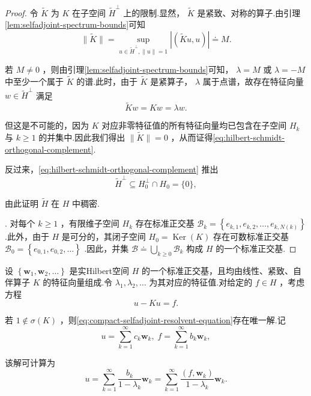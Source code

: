 \begin{proof}
令 $\widetilde{K}$ 为 $K$ 在子空间 ${\widetilde{H}}^{ \bot  }$ 上的限制.显然， $\widetilde{K}$ 是紧致、对称的算子.由引理\ref{lem:selfadjoint-spectrum-bounds}可知
\[
\| \widetilde{K}\|  = \mathop{\sup }\limits_{{u \in  {\widetilde{H}}^{ \bot  },\| u\|  = 1}}\left| \left( {\widetilde{K}u,u}\right) \right|  \doteq  M.
\]

若 $M \neq  0$ ，则由引理\ref{lem:selfadjoint-spectrum-bounds}可知， $\lambda  = M$ 或 $\lambda  =  - M$ 中至少一个属于 $\widetilde{K}$ 的谱.此时，由于 $\widetilde{K}$ 是紧算子， $\lambda$ 属于点谱，故存在特征向量 $w \in  {\widetilde{H}}^{ \bot  }$ 满足
\[
\widetilde{K}w = {Kw} = {\lambda w}.
\]

但这是不可能的，因为 $K$ 对应非零特征值的所有特征向量均已包含在子空间 ${H}_{k}$ 与 $k \geq  1$ 的并集中.因此我们得出 $\| \widetilde{K}\|  = 0$ ，从而证得\eqref{eq:hilbert-schmidt-orthogonal-complement}.

反过来，\eqref{eq:hilbert-schmidt-orthogonal-complement} 推出
\[
{\widetilde{H}}^{ \bot  } \subseteq  {H}_{0}^{ \bot  } \cap  {H}_{0} = \{ 0\} ,
\]

由此证明 $\widetilde{H}$ 在 $H$ 中稠密.

. 对每个 $k \geq  1$ ，有限维子空间 ${H}_{k}$ 存在标准正交基 ${\mathcal{B}}_{k} = \left\{  {{e}_{k,1},{e}_{k,2},\ldots ,{e}_{k,N\left( k\right) }}\right\}$ .此外，由于 $H$ 是可分的，其闭子空间 ${H}_{0} = \operatorname{Ker}\left( K\right)$ 存在可数标准正交基 ${\mathcal{B}}_{0} = \left\{  {{e}_{0,1},{e}_{0,2},\ldots }\right\}$ .因此，并集 $\mathcal{B} \doteq  \mathop{\bigcup }\limits_{{k \geq  0}}{\mathcal{B}}_{k}$ 构成 $H$ 的一个标准正交基.
\end{proof}

\begin{remark}\label{rem:compact-selfadjoint-solution-expansion}
设 $\left\{  {{\bm{w}}_{1},{\bm{w}}_{2},\ldots }\right\}$ 是实Hilbert空间 $H$ 的一个标准正交基，且均由线性、紧致、自伴算子 $K$ 的特征向量组成.令 ${\lambda }_{1},{\lambda }_{2},\ldots$ 为其对应的特征值.对给定的 $f \in  H$ ，考虑方程
\begin{equation}\tag{6.9}\label{eq:compact-selfadjoint-resolvent-equation}
u - {Ku} = f.
\end{equation}

若 $1 \notin  \sigma \left( K\right)$ ，则\eqref{eq:compact-selfadjoint-resolvent-equation}存在唯一解.记
\[
u = \mathop{\sum }\limits_{{k = 1}}^{\infty }{c}_{k}{\bm{w}}_{k},\;f = \mathop{\sum }\limits_{{k = 1}}^{\infty }{b}_{k}{\bm{w}}_{k},
\]

该解可计算为
\begin{equation}\tag{6.10}\label{eq:compact-selfadjoint-resolvent-series}
u = \mathop{\sum }\limits_{{k = 1}}^{\infty }\frac{{b}_{k}}{1 - {\lambda }_{k}}{\bm{w}}_{k} = \mathop{\sum }\limits_{{k = 1}}^{\infty }\frac{\left( f,{\bm{w}}_{k}\right) }{1 - {\lambda }_{k}}{\bm{w}}_{k}.
\end{equation}
\end{remark}

